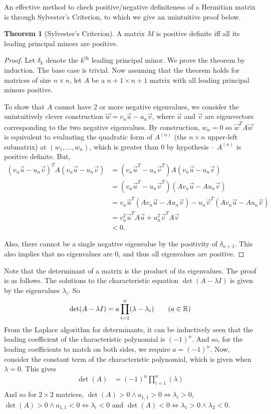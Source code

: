 \documentclass{article}
\theoremstyle{definition}
\newtheorem{thm}{Theorem}[subsubsection]
\begin{document}
An effective method to check positive/negative definiteness of a Hermitian matrix is through Sylvester's Criterion, to which we give an unintuitive proof below.
\begin{thm}[Sylvester's Criterion]
	A matrix $M$ is positive definite iff all its leading principal minors are positive.
\end{thm}
\begin{proof}
	Let $\delta_k$ denote the $k^\text{th}$ leading principal minor. We prove the theorem by induction. The base case is trivial. Now assuming that the theorem holds for matrices of size $n\times n$, let $A$ be a $n+1\times n+1$ matrix with all leading principal minors positive.\par
	
	To show that $A$ cannot have 2 or more negative eigenvalues, we consider the unintuitively clever construction $\vec w=v_n\vec u-u_n\vec v$, where $\vec u$ and $\vec v$ are eigenvectors corresponding to the two negative eigenvalues. By construction, $w_n=0$ so $\vec w^TA\vec w$ is equivalent to evaluating the quadratic form of $A^{(n)}$ (the $n\times n$ upper-left submatrix) at $(w_1,\dots,w_n)$, which is greater than 0 by hypothesis -- $A^{(n)}$ is positive definite. But,
	\begin{align*}
		(v_n\vec u-u_n\vec v)^TA(v_n\vec u-u_n\vec v)&=(v_n\vec u^T-u_n\vec v^T)A(v_n\vec u-u_n\vec v)\\
		&=(v_n\vec u^T-u_n\vec v^T)(Av_n\vec u-Au_n\vec v)\\
		&=v_n\vec u^T(Av_n\vec u-Au_n\vec v)-u_n\vec v^T(Av_n\vec u-Au_n\vec v)\\
		&=v_n^2\vec u^TA\vec u+u_n^2\vec v^TA\vec v\\
		&<0.
	\end{align*}\par
	Also, there cannot be a single negative eigenvalue by the positivity of $\delta_{n+1}$. This also implies that no eigenvalues are 0, and thus all eigenvalues are positive.
\end{proof}

\vspace{6mm}
Note that the determinant of a matrix is the product of its eigenvalues. The proof is as follows. The solutions to the characteristic equation $\det(A-\lambda I)$ is given by the eigenvalues $\lambda_i$. So 
\[\det(A-\lambda I)=a\prod_{i=1}^n(\lambda-\lambda_i)\tag{$a\in\mathbb{R}$}\] 
From the Laplace algorithm for determinants, it can be inductively seen that the leading coefficient of the characteristic polynomial is $(-1)^n$. And so, for the leading coefficients to match on both sides, we require $a=(-1)^n$. Now, consider the constant term of the characteristic polynomial, which is given when $\lambda=0$. This gives
\begin{align*}
	\det(A)&=(-1)^n\prod_{i=1}^n(\lambda)\\
\end{align*}
And so for $2\times2$ matrices, $\det(A)>0\land a_{1,1}>0\Leftrightarrow\lambda_i>0$, $\det(A)>0\land a_{1,1}<0\Leftrightarrow\lambda_i<0$ and $\det(A)<0\Leftrightarrow\lambda_1>0\land\lambda_2<0$.
\end{document}
